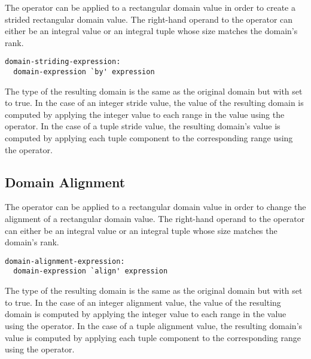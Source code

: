 The  operator can be applied to a rectangular domain value in
order to create a strided rectangular domain value.  The right-hand
operand to the  operator can either be an integral value or
an integral tuple whose size matches the domain's rank.

\begin{syntax}
\begin{verbatim}
domain-striding-expression:
  domain-expression `by' expression
\end{verbatim}
\end{syntax}

The type of the resulting domain is the same as the original domain
but with  set to true.  In the case of an integer
stride value, the value of the resulting domain is computed by
applying the integer value to each range in the value using the
 operator.  In the case of a tuple stride value, the resulting
domain's value is computed by applying each tuple component to the
corresponding range using the  operator.


\subsection{Domain Alignment}
\label{Domain_Alignment}

The  operator can be applied to a rectangular domain value in
order to change the alignment of a rectangular domain value.  The right-hand
operand to the  operator can either be an integral value or
an integral tuple whose size matches the domain's rank.

\begin{syntax}
\begin{verbatim}
domain-alignment-expression:
  domain-expression `align' expression
\end{verbatim}
\end{syntax}

The type of the resulting domain is the same as the original domain
but with  set to true.
In the case of an integer alignment value, the value of the resulting
domain is computed by applying the integer value to each range in the
value using the  operator.  In the case of a tuple
alignment value, the resulting domain's value is computed by applying
each tuple component to the corresponding range using the 
operator.


